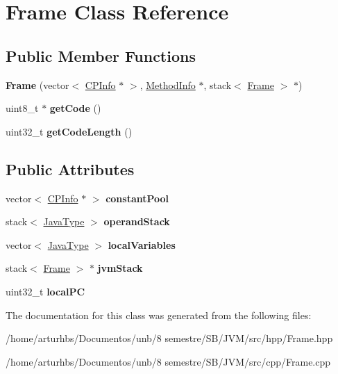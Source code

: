 \hypertarget{classFrame}{}\section{Frame Class Reference}
\label{classFrame}
\subsection*{Public Member Functions}
\begin{DoxyCompactItemize}
\item 
{\bfseries Frame} (vector$<$ \hyperlink{classCPInfo}{C\+P\+Info} $\ast$ $>$, \hyperlink{classMethodInfo}{Method\+Info} $\ast$, stack$<$ \hyperlink{classFrame}{Frame} $>$ $\ast$)\hypertarget{classFrame_a422ab83c8b29489601a4bac02d4e171e}{}\label{classFrame_a422ab83c8b29489601a4bac02d4e171e}

\item 
uint8\+\_\+t $\ast$ {\bfseries get\+Code} ()\hypertarget{classFrame_aac40e0ebfeb7b3298b59c37a7f4e3006}{}\label{classFrame_aac40e0ebfeb7b3298b59c37a7f4e3006}

\item 
uint32\+\_\+t {\bfseries get\+Code\+Length} ()\hypertarget{classFrame_a9233523486da4fa4ac786883f519fe17}{}\label{classFrame_a9233523486da4fa4ac786883f519fe17}

\end{DoxyCompactItemize}
\subsection*{Public Attributes}
\begin{DoxyCompactItemize}
\item 
vector$<$ \hyperlink{classCPInfo}{C\+P\+Info} $\ast$ $>$ {\bfseries constant\+Pool}\hypertarget{classFrame_a7f1b0dca3dccb5cf3c92c35f1d0f2ef3}{}\label{classFrame_a7f1b0dca3dccb5cf3c92c35f1d0f2ef3}

\item 
stack$<$ \hyperlink{structJavaType}{Java\+Type} $>$ {\bfseries operand\+Stack}\hypertarget{classFrame_a5ed7f6e3ef7c99846894cb09597a3b3f}{}\label{classFrame_a5ed7f6e3ef7c99846894cb09597a3b3f}

\item 
vector$<$ \hyperlink{structJavaType}{Java\+Type} $>$ {\bfseries local\+Variables}\hypertarget{classFrame_af2f6d1ea56afb31babe6b10d3718bb65}{}\label{classFrame_af2f6d1ea56afb31babe6b10d3718bb65}

\item 
stack$<$ \hyperlink{classFrame}{Frame} $>$ $\ast$ {\bfseries jvm\+Stack}\hypertarget{classFrame_a985706d77698649f468e37414612a9a8}{}\label{classFrame_a985706d77698649f468e37414612a9a8}

\item 
uint32\+\_\+t {\bfseries local\+PC}\hypertarget{classFrame_a1e4cb428fe4e3008590cb9bebfdca2a1}{}\label{classFrame_a1e4cb428fe4e3008590cb9bebfdca2a1}

\end{DoxyCompactItemize}


The documentation for this class was generated from the following files\+:\begin{DoxyCompactItemize}
\item 
/home/arturhbs/\+Documentos/unb/8 semestre/\+S\+B/\+J\+V\+M/src/hpp/Frame.\+hpp\item 
/home/arturhbs/\+Documentos/unb/8 semestre/\+S\+B/\+J\+V\+M/src/cpp/Frame.\+cpp\end{DoxyCompactItemize}

